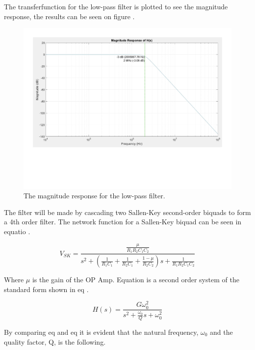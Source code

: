The transferfunction for the low-pass filter is plotted to see the magnitude response, the results can be seen on figure .
\begin{figure}[H]
    \centering
    \includegraphics[clip, trim=0 150 0 0, width=1\textwidth]{Sections/7_SystemDesign/Figures/7_2_4_AAFILT_HS.pdf}
    \caption{The magnitude response for the low-pass filter.}
    \label{fig_7_1_4_MAGRESP}
\end{figure}

The filter will be made by cascading two Sallen-Key second-order biquads to form a 4th order filter. The network function for a Sallen-Key biquad can be seen in equatio  \cite{ANALOGFILTERS}.

\begin{equation}\label{eq:7_1_4_SallenKeyTF}
    V_{SK} = \frac{  \frac{\mu}{R_1R_2C_1C_2}}{s^2 + (\frac{1}{R_1C_1} + \frac{1}{R_2C_1} + \frac{1 - \mu}{R_2C_2})s + \frac{1}{R_1R_2C_1C_2}}
\end{equation}

Where $\mu$ is the gain of the OP Amp. Equation  is a second order system of the standard form shown in eq .

\begin{equation}\label{eq:7_1_4_SecondOrderSystem}
   H(s) = \frac{G\omega_0^2}{s^2 + \frac{\omega_0}{Q}s + \omega_0^2}
\end{equation}

By comparing eq  and eq  it is evident that the natural frequency, $\omega_0$ and the quality factor, Q, is the following.

